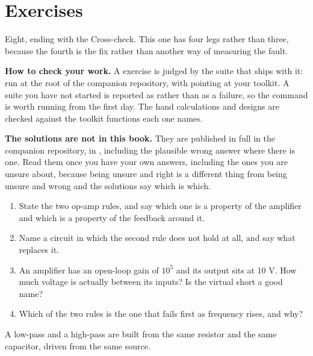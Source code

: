 
\section{Exercises}
\label{c3:sec:exercises}

Eight, ending with the Cross-check. This one has four legs rather than three, because the fourth is the fix rather than another way of measuring the fault.

\begin{aside}
\textbf{How to check your work.} A  exercise is judged by the suite that ships with it: run  at the root of the companion repository, with  pointing at your toolkit. A suite you have not started is reported as  rather than as a failure, so the command is worth running from the first day. The hand calculations and designs are checked against the toolkit functions each one names.

\textbf{The solutions are not in this book.} They are published in full in the companion repository, in , including the plausible wrong answer where there is one. Read them once you have your own answers, including the ones you are unsure about, because being unsure and right is a different thing from being unsure and wrong and the solutions say which is which.
\end{aside}

\label{c3:ex:1}
\begin{enumerate}
  \item State the two op-amp rules, and say which one is a property of the amplifier and which is a property of the feedback around it.
  \item Name a circuit in which the second rule does not hold at all, and say what replaces it.
  \item An amplifier has an open-loop gain of $10^5$ and its output sits at 10 V. How much voltage is actually between its inputs? Is the virtual short a good name?
  \item Which of the two rules is the one that fails first as frequency rises, and why?
\end{enumerate}

\label{c3:ex:2}
A low-pass and a high-pass are built from the same resistor and the same capacitor, driven from the same source.

